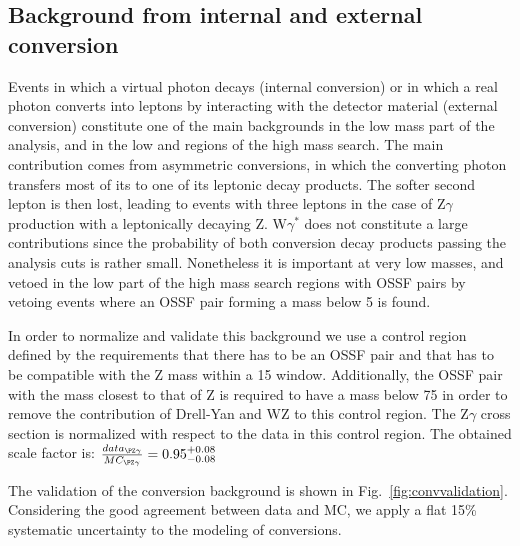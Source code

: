 \subsection{Background from internal and external conversion}
Events in which a virtual photon decays (internal conversion) or in
which a  real photon converts into leptons by interacting with the
detector material (external conversion) constitute one of the main backgrounds in the
 low mass part of the analysis, and in the low \mmin  and \mlll
  regions of the high mass search. The main contribution comes from
  asymmetric conversions, in which the converting photon transfers
  most of its \pt to one of its leptonic decay products. The softer
  second lepton is then lost, leading to events with three leptons
 in the case of Z$\gamma$ production with a leptonically decaying
 Z. W$\gamma^{*}$ does not constitute a large contributions since the
 probability of both conversion decay products passing the analysis
 \pt cuts is rather small. Nonetheless it is important at very low
 masses, and vetoed in the low \mlll  part of the high mass search
 regions with OSSF pairs by vetoing events where an OSSF pair forming a mass below 5 \GeV is found.

In order to normalize and validate this background we use a control
region defined by the requirements that there has to be an OSSF pair
and that \mlll  has to be compatible with the Z mass within a 15 \GeV
window. Additionally, the OSSF pair with the mass closest to that of Z
is required to have a mass below 75 \GeV in order to remove the
contribution of Drell-Yan and WZ to this control region. The Z$\gamma$
cross section is normalized with respect to the data in this control
region. The obtained scale factor is:
$\frac{data_{\PZ\gamma}}{MC_{\PZ\gamma}} = 0.95_{-0.08}^{+0.08}$

The validation of the conversion background is shown in Fig.~\ref{fig:convvalidation}. Considering the good agreement between data and MC, we apply a flat 15\% systematic uncertainty to the modeling of conversions.

